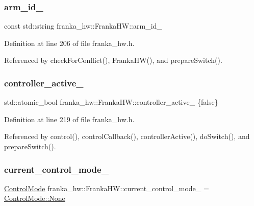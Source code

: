 \subsubsection{\texorpdfstring{arm\+\_\+id\+\_\+}{arm\_id\_}}
{\footnotesize\ttfamily const std\+::string franka\+\_\+hw\+::\+Franka\+H\+W\+::arm\+\_\+id\+\_\+\hspace{0.3cm}{\ttfamily [private]}}



Definition at line 206 of file franka\+\_\+hw.\+h.



Referenced by check\+For\+Conflict(), Franka\+H\+W(), and prepare\+Switch().

\mbox{\label{classfranka__hw_1_1FrankaHW_aa207ee4ba133fdb1b3887c9639b47b40}} 
\subsubsection{\texorpdfstring{controller\+\_\+active\+\_\+}{controller\_active\_}}
{\footnotesize\ttfamily std\+::atomic\+\_\+bool franka\+\_\+hw\+::\+Franka\+H\+W\+::controller\+\_\+active\+\_\+ \{false\}\hspace{0.3cm}{\ttfamily [private]}}



Definition at line 219 of file franka\+\_\+hw.\+h.



Referenced by control(), control\+Callback(), controller\+Active(), do\+Switch(), and prepare\+Switch().

\mbox{\label{classfranka__hw_1_1FrankaHW_a4eb4ed0043449742cadefa5809d9c6f0}} 
\subsubsection{\texorpdfstring{current\+\_\+control\+\_\+mode\+\_\+}{current\_control\_mode\_}}
{\footnotesize\ttfamily \hyperlink{namespacefranka__hw_afa416558ce4baace5ac6c71bd5d2c98c}{Control\+Mode} franka\+\_\+hw\+::\+Franka\+H\+W\+::current\+\_\+control\+\_\+mode\+\_\+ = \hyperlink{namespacefranka__hw_afa416558ce4baace5ac6c71bd5d2c98ca6adf97f83acf6453d4a6a4b1070f3754}{Control\+Mode\+::\+None}\hspace{0.3cm}{\ttfamily [private]}}



